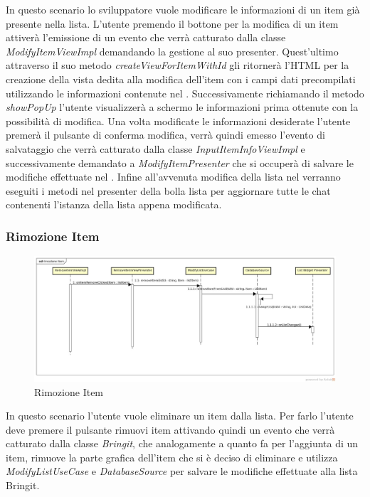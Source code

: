 In questo scenario lo sviluppatore vuole modificare le informazioni di un item già presente nella lista. L'utente premendo il bottone per la modifica di un item attiverà l'emissione di un evento che verrà catturato dalla classe \textit{ModifyItemViewImpl} demandando la gestione al suo presenter. Quest'ultimo attraverso il suo metodo \textit{createViewForItemWithId} gli ritornerà l'HTML per la creazione della vista dedita alla modifica dell'item con i campi dati precompilati utilizzando le informazioni contenute nel . Successivamente richiamando il metodo \textit{showPopUp} l'utente visualizzerà a schermo le informazioni prima ottenute con la possibilità di modifica. Una volta modificate le informazioni desiderate l'utente premerà il pulsante di conferma modifica, verrà quindi emesso l'evento di salvataggio che verrà catturato dalla classe \textit{InputItemInfoViewImpl} e successivamente demandato a \textit{ModifyItemPresenter} che si occuperà di salvare le modifiche effettuate nel . Infine all'avvenuta modifica della lista nel  verranno eseguiti i metodi nel presenter della bolla lista per aggiornare tutte le chat contenenti l'istanza della lista appena modificata. 

\subsubsection{Rimozione Item}

\label{Rimozione Item }
\begin{figure}[H]
	\centering
	\includegraphics[width=\textwidth]{Sezioni/Diagrammi/App/rimozione_item.jpg}
	\caption{Rimozione Item}
	
\end{figure}
In questo scenario l'utente vuole eliminare un item dalla lista. Per farlo l'utente deve premere il pulsante rimuovi item attivando quindi un evento che verrà catturato dalla classe \textit{Bringit}, che analogamente a quanto fa per l'aggiunta di un item, rimuove la parte grafica dell'item che si è deciso di eliminare e utilizza \textit{ModifyListUseCase} e \textit{DatabaseSource} per salvare le modifiche effettuate alla lista Bringit.


